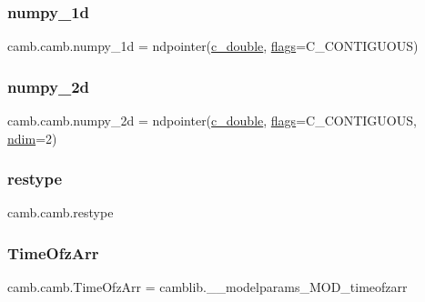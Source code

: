\subsubsection{\texorpdfstring{numpy\+\_\+1d}{numpy\_1d}}
{\footnotesize\ttfamily camb.\+camb.\+numpy\+\_\+1d = ndpointer(\mbox{\hyperlink{namespacecamb_1_1camb_a9bb9b4d27cefdc5b8d0c9ecf508462cf}{c\+\_\+double}}, \mbox{\hyperlink{namespacecamb_1_1camb_aa84470703add02037beda61ea31c02e9}{flags}}=\textquotesingle{}C\+\_\+\+C\+O\+N\+T\+I\+G\+U\+O\+US\textquotesingle{})}

\mbox{\label{namespacecamb_1_1camb_aaccb5cdabc7a4aff9696405380103e7e}} 
\subsubsection{\texorpdfstring{numpy\+\_\+2d}{numpy\_2d}}
{\footnotesize\ttfamily camb.\+camb.\+numpy\+\_\+2d = ndpointer(\mbox{\hyperlink{namespacecamb_1_1camb_a9bb9b4d27cefdc5b8d0c9ecf508462cf}{c\+\_\+double}}, \mbox{\hyperlink{namespacecamb_1_1camb_aa84470703add02037beda61ea31c02e9}{flags}}=\textquotesingle{}C\+\_\+\+C\+O\+N\+T\+I\+G\+U\+O\+US\textquotesingle{}, \mbox{\hyperlink{namespacecamb_1_1camb_a1ab298aa884f117a7e6b56a81f694806}{ndim}}=2)}

\mbox{\label{namespacecamb_1_1camb_a007debd6eaa7dfaa6b646e1d52d44e23}} 
\subsubsection{\texorpdfstring{restype}{restype}}
{\footnotesize\ttfamily camb.\+camb.\+restype}

\mbox{\label{namespacecamb_1_1camb_a03f52f2e7698d22d7b202f45ef067413}} 
\subsubsection{\texorpdfstring{Time\+Ofz\+Arr}{TimeOfzArr}}
{\footnotesize\ttfamily camb.\+camb.\+Time\+Ofz\+Arr = camblib.\+\_\+\+\_\+modelparams\+\_\+\+M\+O\+D\+\_\+timeofzarr}




